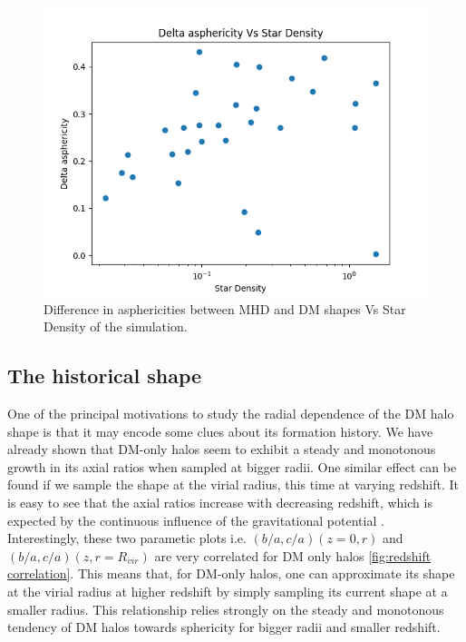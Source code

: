 \documentclass[a4paper,fleqn,usenatbib]{mnras}
\begin{document}
\begin{figure}
	\includegraphics[width=\columnwidth]{./pics/Delta asphericity Vs Star Density.png}
    \caption{Difference in asphericities between MHD and DM shapes Vs Star Density of the simulation.}
    \label{fig:Star_Density_effect}
\end{figure}

\subsection{The historical shape}
One of the principal motivations to study the radial dependence of the DM halo shape is that it may encode some clues about its formation history. We have already shown that DM-only halos seem to exhibit a steady and monotonous growth in its axial ratios when sampled at bigger radii. One similar effect can be found if we sample the shape at the virial radius, this time at varying redshift. It is easy to see that the axial ratios increase with decreasing redshift, which is expected by the continuous influence of the gravitational potential \cite{VeraCiro}. \\   


Interestingly, these two parametic plots i.e. $(b/a,c/a)(z=0,r)$ and $(b/a,c/a)(z,r=R_{vir})$ are very correlated for DM only halos \ref{fig:redshift correlation}. This means that, for DM-only halos, one can approximate its shape at the virial radius at higher redshift by simply sampling its current shape at a smaller radius. This relationship relies strongly on the steady and monotonous tendency of DM halos towards sphericity for bigger radii and smaller redshift.\\
\end{document}
